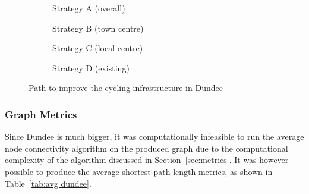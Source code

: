 \documentclass[12pt,a4paper]{report}
\begin{document}
\begin{figure}[ht]
    \centering
    \begin{subfigure}[ht]{0.47\textwidth}
        \centering
        
        \caption{Strategy A (overall)}
        \label{fig:overall dundee}
    \end{subfigure}
    \hfill
    \begin{subfigure}[ht]{0.47\textwidth}
        \centering
        
        \caption{Strategy B (town centre)}
        \label{fig:centre dundee}
    \end{subfigure}
    \hfill
    \begin{subfigure}[ht]{0.47\textwidth}
        \centering
        
        \caption{Strategy C (local centre)}
        \label{fig:local dundee}
    \end{subfigure}
    \hfill
    \begin{subfigure}[ht]{0.47\textwidth}
        \centering
        
        \caption{Strategy D (existing)}
        \label{fig:existing dundee}
    \end{subfigure}
       \caption{Path to improve the cycling infrastructure in Dundee}
       \label{fig:path dundee}
\end{figure}

\subsubsection*{Graph Metrics}
Since Dundee is much bigger, it was computationally infeasible to run the average node connectivity algorithm on the produced graph due to the computational complexity of the algorithm discussed in Section~\ref{sec:metrics}. It was however possible to produce the average shortest path length metrics, as shown in Table~\ref{tab:avg dundee}.
\end{document}
